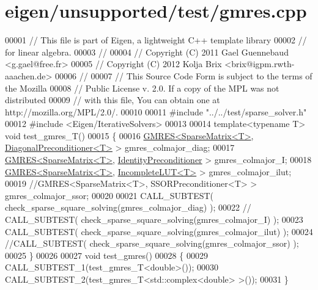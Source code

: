 \hypertarget{eigen_2unsupported_2test_2gmres_8cpp_source}{}\section{eigen/unsupported/test/gmres.cpp}
\label{eigen_2unsupported_2test_2gmres_8cpp_source}

\begin{DoxyCode}
00001 \textcolor{comment}{// This file is part of Eigen, a lightweight C++ template library}
00002 \textcolor{comment}{// for linear algebra.}
00003 \textcolor{comment}{//}
00004 \textcolor{comment}{// Copyright (C) 2011 Gael Guennebaud <g.gael@free.fr>}
00005 \textcolor{comment}{// Copyright (C) 2012 Kolja Brix <brix@igpm.rwth-aaachen.de>}
00006 \textcolor{comment}{//}
00007 \textcolor{comment}{// This Source Code Form is subject to the terms of the Mozilla}
00008 \textcolor{comment}{// Public License v. 2.0. If a copy of the MPL was not distributed}
00009 \textcolor{comment}{// with this file, You can obtain one at http://mozilla.org/MPL/2.0/.}
00010 
00011 \textcolor{preprocessor}{#include "../../test/sparse\_solver.h"}
00012 \textcolor{preprocessor}{#include <Eigen/IterativeSolvers>}
00013 
00014 \textcolor{keyword}{template}<\textcolor{keyword}{typename} T> \textcolor{keywordtype}{void} test\_gmres\_T()
00015 \{
00016   \hyperlink{group___iterative_linear_solvers___module_class_eigen_1_1_g_m_r_e_s}{GMRES<SparseMatrix<T>}, \hyperlink{group___iterative_linear_solvers___module_class_eigen_1_1_diagonal_preconditioner}{DiagonalPreconditioner<T>} > 
      gmres\_colmajor\_diag;
00017   \hyperlink{group___iterative_linear_solvers___module_class_eigen_1_1_g_m_r_e_s}{GMRES<SparseMatrix<T>}, \hyperlink{group___iterative_linear_solvers___module_class_eigen_1_1_identity_preconditioner}{IdentityPreconditioner}    > 
      gmres\_colmajor\_I;
00018   \hyperlink{group___iterative_linear_solvers___module_class_eigen_1_1_g_m_r_e_s}{GMRES<SparseMatrix<T>}, \hyperlink{group___iterative_linear_solvers___module_class_eigen_1_1_incomplete_l_u_t}{IncompleteLUT<T>} >           
      gmres\_colmajor\_ilut;
00019   \textcolor{comment}{//GMRES<SparseMatrix<T>, SSORPreconditioner<T> >     gmres\_colmajor\_ssor;}
00020 
00021   CALL\_SUBTEST( check\_sparse\_square\_solving(gmres\_colmajor\_diag)  );
00022 \textcolor{comment}{//   CALL\_SUBTEST( check\_sparse\_square\_solving(gmres\_colmajor\_I)     );}
00023   CALL\_SUBTEST( check\_sparse\_square\_solving(gmres\_colmajor\_ilut)     );
00024   \textcolor{comment}{//CALL\_SUBTEST( check\_sparse\_square\_solving(gmres\_colmajor\_ssor)     );}
00025 \}
00026 
00027 \textcolor{keywordtype}{void} test\_gmres()
00028 \{
00029   CALL\_SUBTEST\_1(test\_gmres\_T<double>());
00030   CALL\_SUBTEST\_2(test\_gmres\_T<std::complex<double> >());
00031 \}
\end{DoxyCode}
